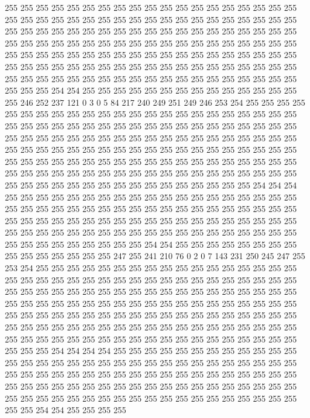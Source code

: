 255 255 255 255 255 255 255 255 255 255 255 255 255 255 255 255 255 255 255 255
255 255 255 255 255 255 255 255 255 255 255 255 255 255 255 255 255 255 255 255
255 255 255 255 255 255 255 255 255 255 255 255 255 255 255 255 255 255 255 255
255 255 255 255 255 255 255 255 255 255 255 255 255 255 255 255 255 255 255 255
255 255 255 255 255 255 255 255 255 255 255 255 255 255 255 255 255 255 255 255
255 255 255 255 255 255 255 255 255 255 255 255 255 255 255 255 255 255 255 255
255 255 255 255 255 255 255 255 255 255 255 255 255 255 255 255 254 254 255 255
255 255 255 255 255 255 255 255 255 255 255 255 255 246 252 237 121 0 3 0
5 84 217 240 249 251 249 246 253 254 255 255 255 255 255 255 255 255 255 255
255 255 255 255 255 255 255 255 255 255 255 255 255 255 255 255 255 255 255 255
255 255 255 255 255 255 255 255 255 255 255 255 255 255 255 255 255 255 255 255
255 255 255 255 255 255 255 255 255 255 255 255 255 255 255 255 255 255 255 255
255 255 255 255 255 255 255 255 255 255 255 255 255 255 255 255 255 255 255 255
255 255 255 255 255 255 255 255 255 255 255 255 255 255 255 255 255 255 255 255
255 255 255 255 255 255 255 255 255 255 255 255 255 255 255 255 255 255 255 255
255 255 255 255 254 254 254 255 255 255 255 255 255 255 255 255 255 255 255 255
255 255 255 255 255 255 255 255 255 255 255 255 255 255 255 255 255 255 255 255
255 255 255 255 255 255 255 255 255 255 255 255 255 255 255 255 255 255 255 255
255 255 255 255 255 255 255 255 255 255 255 255 255 255 255 255 255 255 255 255
255 255 255 255 255 255 255 255 255 255 255 255 254 254 255 255 255 255 255 255
255 255 255 255 255 255 255 255 255 247 255 241 210 76 0 2 0 7 143 231
250 245 247 255 253 254 255 255 255 255 255 255 255 255 255 255 255 255 255 255
255 255 255 255 255 255 255 255 255 255 255 255 255 255 255 255 255 255 255 255
255 255 255 255 255 255 255 255 255 255 255 255 255 255 255 255 255 255 255 255
255 255 255 255 255 255 255 255 255 255 255 255 255 255 255 255 255 255 255 255
255 255 255 255 255 255 255 255 255 255 255 255 255 255 255 255 255 255 255 255
255 255 255 255 255 255 255 255 255 255 255 255 255 255 255 255 255 255 255 255
255 255 255 255 255 255 255 255 255 255 255 255 255 255 255 255 255 255 255 255
254 254 254 254 255 255 255 255 255 255 255 255 255 255 255 255 255 255 255 255
255 255 255 255 255 255 255 255 255 255 255 255 255 255 255 255 255 255 255 255
255 255 255 255 255 255 255 255 255 255 255 255 255 255 255 255 255 255 255 255
255 255 255 255 255 255 255 255 255 255 255 255 255 255 255 255 255 255 255 255
255 255 255 255 255 255 255 255 255 255 255 255 255 255 254 254 255 255 255 255
